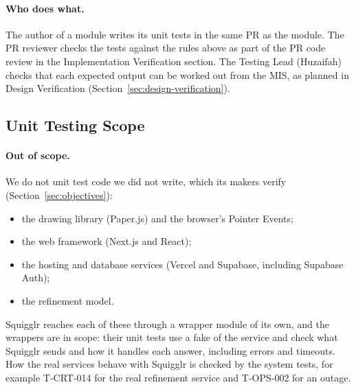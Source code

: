 \documentclass[12pt, titlepage]{article}
\begin{document}
\paragraph{Who does what.} The author of a module writes its unit tests in
the same PR as the module. The PR reviewer checks the tests against the rules
above as part of the PR code review in the Implementation
Verification section. The Testing Lead (Huzaifah) checks
that each expected output can be worked out from the MIS, as planned in
Design Verification (Section~\ref{sec:design-verification}).

\subsection{Unit Testing Scope}

\paragraph{Out of scope.} We do not unit test code we did not write, which
its makers verify (Section~\ref{sec:objectives}):
\begin{itemize}
\item the drawing library (Paper.js) and the browser's Pointer Events;
\item the web framework (Next.js and React);
\item the hosting and database services (Vercel and Supabase, including
Supabase Auth);
\item the refinement model.
\end{itemize}
Squigglr reaches each of these through a wrapper module of its own, and the
wrappers are in scope: their unit tests use a fake of the service and check
what Squigglr sends and how it handles each answer, including errors and
timeouts. How the real services behave with Squigglr is checked by the
system tests, for example T-CRT-014 for the real refinement service and
T-OPS-002 for an outage.
\end{document}
